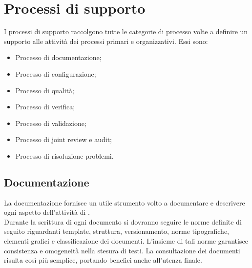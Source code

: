 \section{Processi di supporto}\label{section:Processi di supporto}
I processi di supporto raccolgono tutte le categorie di processo volte a definire un supporto alle attività dei processi primari e organizzativi. Essi sono:
\begin{itemize}
\item Processo di documentazione;
\item Processo di configurazione;
\item Processo di qualità;
\item Processo di verifica;
\item Processo di validazione;
\item Processo di joint review e audit;
\item Processo di risoluzione problemi.
\end{itemize}

\subsection{Documentazione}\label{subsection:documentazione}
La documentazione fornisce un utile strumento volto a documentare e descrivere ogni aspetto dell'attività di \groupName{}.\\
Durante la scrittura di ogni documento si dovranno seguire le norme definite di seguito riguardanti template, struttura, versionamento, norme tipografiche, elementi grafici e classificazione dei documenti. L'insieme di tali norme garantisce consistenza e omogeneità nella stesura di testi. La consultazione dei documenti risulta così più semplice, portando benefici anche all'utenza finale.

